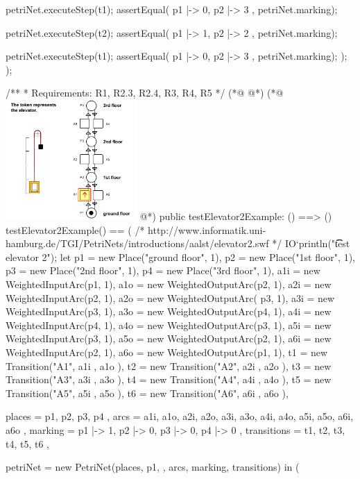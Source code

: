 \begin{vdmpp}
      petriNet.executeStep(t1);
      assertEqual({ p1 |-> 0, p2 |-> 3 }, petriNet.marking);

      petriNet.executeStep(t2);
      assertEqual({ p1 |-> 1, p2 |-> 2 }, petriNet.marking);

      petriNet.executeStep(t1);
      assertEqual({ p1 |-> 0, p2 |-> 3 }, petriNet.marking);
    );
  );

  /**
   * Requirements: R1, R2.3, R2.4, R3, R4, R5
   */
(*@
\label{testElevator2Example:60}
@*)
(*@
\includegraphics[width=5cm]{specification/elevator2.png}
@*)
  public testElevator2Example: () ==> ()
  testElevator2Example() == (
    /* http://www.informatik.uni-hamburg.de/TGI/PetriNets/introductions/aalst/elevator2.swf */
    IO`println("\t\t test elevator 2");
    let p1 = new Place("ground floor", 1),
     p2 = new Place("1st floor", 1),
     p3 = new Place("2nd floor", 1),
     p4 = new Place("3rd floor", 1),
     a1i = new WeightedInputArc(p1, 1),
     a1o = new WeightedOutputArc(p2, 1),
     a2i = new WeightedInputArc(p2, 1),
     a2o = new WeightedOutputArc( p3, 1),
     a3i = new WeightedInputArc(p3, 1),
     a3o = new WeightedOutputArc(p4, 1),
     a4i = new WeightedInputArc(p4, 1),
     a4o = new WeightedOutputArc(p3, 1),
     a5i = new WeightedInputArc(p3, 1),
     a5o = new WeightedOutputArc(p2, 1),
     a6i = new WeightedInputArc(p2, 1),
     a6o = new WeightedOutputArc(p1, 1),
     t1 = new Transition("A1", { a1i }, { a1o }),
     t2 = new Transition("A2", { a2i }, { a2o }),
     t3 = new Transition("A3", { a3i }, { a3o }),
     t4 = new Transition("A4", { a4i }, { a4o }),
     t5 = new Transition("A5", { a5i }, { a5o }),
     t6 = new Transition("A6", { a6i }, { a6o }),

     places = { p1, p2, p3, p4 },
     arcs = { a1i, a1o, a2i, a2o, a3i, a3o, a4i, a4o, a5i, a5o, a6i, a6o },
     marking = { p1 |-> 1, p2 |-> 0, p3 |-> 0, p4 |-> 0 },
     transitions = { t1, t2, t3, t4, t5, t6 },

     petriNet = new PetriNet(places, p1, {}, arcs, marking, transitions) in (


\end{vdmpp}
